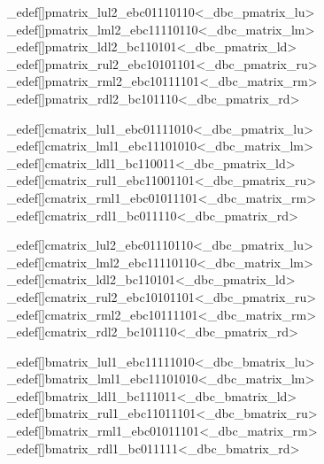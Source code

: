 \brl@char_edef[]{pmatrix_lul2}{\brl@char_ebc01110110}<\brl@char@alias_dbc_pmatrix_lu>
\brl@char_edef[]{pmatrix_lml2}{\brl@char_ebc11110110}<\brl@char@alias_dbc_matrix_lm>
\brl@char_edef[]{pmatrix_ldl2}{\brl@char_bc110101}<\brl@char@alias_dbc_pmatrix_ld>
\brl@char_edef[]{pmatrix_rul2}{\brl@char_ebc10101101}<\brl@char@alias_dbc_pmatrix_ru>
\brl@char_edef[]{pmatrix_rml2}{\brl@char_ebc10111101}<\brl@char@alias_dbc_matrix_rm>
\brl@char_edef[]{pmatrix_rdl2}{\brl@char_bc101110}<\brl@char@alias_dbc_pmatrix_rd>

\brl@char_edef[]{cmatrix_lul1}{\brl@char_ebc01111010}<\brl@char@alias_dbc_pmatrix_lu>
\brl@char_edef[]{cmatrix_lml1}{\brl@char_ebc11101010}<\brl@char@alias_dbc_matrix_lm>
\brl@char_edef[]{cmatrix_ldl1}{\brl@char_bc110011}<\brl@char@alias_dbc_pmatrix_ld>
\brl@char_edef[]{cmatrix_rul1}{\brl@char_ebc11001101}<\brl@char@alias_dbc_pmatrix_ru>
\brl@char_edef[]{cmatrix_rml1}{\brl@char_ebc01011101}<\brl@char@alias_dbc_matrix_rm>
\brl@char_edef[]{cmatrix_rdl1}{\brl@char_bc011110}<\brl@char@alias_dbc_pmatrix_rd>

\brl@char_edef[]{cmatrix_lul2}{\brl@char_ebc01110110}<\brl@char@alias_dbc_pmatrix_lu>
\brl@char_edef[]{cmatrix_lml2}{\brl@char_ebc11110110}<\brl@char@alias_dbc_matrix_lm>
\brl@char_edef[]{cmatrix_ldl2}{\brl@char_bc110101}<\brl@char@alias_dbc_pmatrix_ld>
\brl@char_edef[]{cmatrix_rul2}{\brl@char_ebc10101101}<\brl@char@alias_dbc_pmatrix_ru>
\brl@char_edef[]{cmatrix_rml2}{\brl@char_ebc10111101}<\brl@char@alias_dbc_matrix_rm>
\brl@char_edef[]{cmatrix_rdl2}{\brl@char_bc101110}<\brl@char@alias_dbc_pmatrix_rd>

\brl@char_edef[]{bmatrix_lul1}{\brl@char_ebc11111010}<\brl@char@alias_dbc_bmatrix_lu>
\brl@char_edef[]{bmatrix_lml1}{\brl@char_ebc11101010}<\brl@char@alias_dbc_matrix_lm>
\brl@char_edef[]{bmatrix_ldl1}{\brl@char_bc111011}<\brl@char@alias_dbc_bmatrix_ld>
\brl@char_edef[]{bmatrix_rul1}{\brl@char_ebc11011101}<\brl@char@alias_dbc_bmatrix_ru>
\brl@char_edef[]{bmatrix_rml1}{\brl@char_ebc01011101}<\brl@char@alias_dbc_matrix_rm>
\brl@char_edef[]{bmatrix_rdl1}{\brl@char_bc011111}<\brl@char@alias_dbc_bmatrix_rd>


